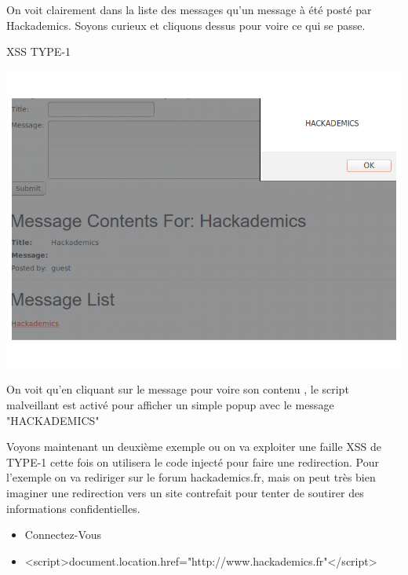 \begin{itemize}
\bigskip

\begin{flushleft}
On voit clairement dans la liste des messages qu'un message à été posté par Hackademics. Soyons curieux et cliquons dessus pour voire ce qui se passe.
\end{flushleft}

\begin{center}
\caption{XSS TYPE-1}
\includegraphics[scale=0.3]{Web/assets/xsst1-2.png}
\end{center}

\bigskip

\begin{flushleft}
On voit qu'en cliquant sur le message pour voire son contenu , le script malveillant est activé pour afficher un simple popup avec le message "HACKADEMICS"

\bigskip

Voyons maintenant un deuxième exemple ou on va exploiter une faille XSS de TYPE-1 cette fois on utilisera le code injecté pour faire une redirection. Pour l'exemple on va rediriger sur le forum  hackademics.fr, mais on peut très bien imaginer une redirection vers un site contrefait pour tenter de soutirer des informations confidentielles.
\end{flushleft}

\bigskip

\begin{itemize}
\item Connectez-Vous
\item <script>document.location.href="http://www.hackademics.fr"</script>
\end{itemize}


\end{itemize}
